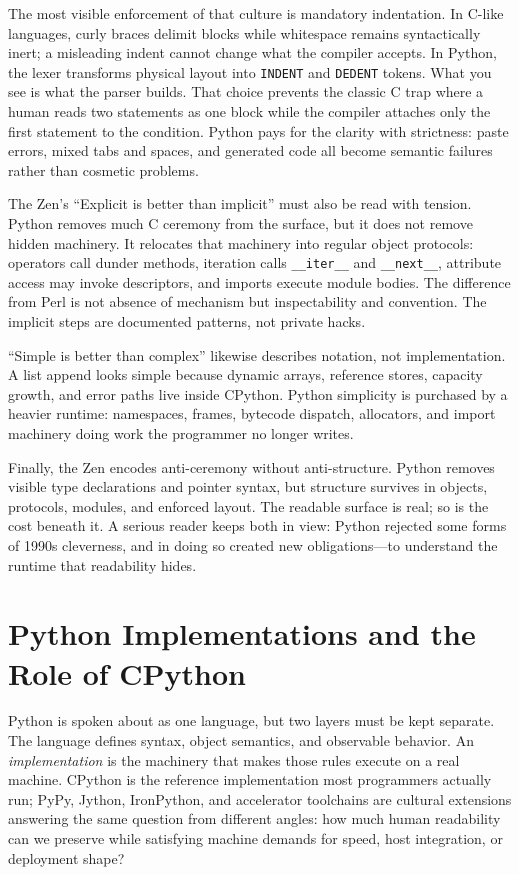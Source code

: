 \documentclass[a4paper,twoside]{report}
\begin{document}
The most visible enforcement of that culture is mandatory indentation. In C-like languages, curly braces delimit blocks while whitespace remains syntactically inert; a misleading indent cannot change what the compiler accepts. In Python, the lexer transforms physical layout into \texttt{INDENT} and \texttt{DEDENT} tokens. What you see is what the parser builds. That choice prevents the classic C trap where a human reads two statements as one block while the compiler attaches only the first statement to the condition. Python pays for the clarity with strictness: paste errors, mixed tabs and spaces, and generated code all become semantic failures rather than cosmetic problems.

The Zen's ``Explicit is better than implicit'' must also be read with tension. Python removes much C ceremony from the surface, but it does not remove hidden machinery. It relocates that machinery into regular object protocols: operators call dunder methods, iteration calls \texttt{\_\_iter\_\_} and \texttt{\_\_next\_\_}, attribute access may invoke descriptors, and imports execute module bodies. The difference from Perl is not absence of mechanism but inspectability and convention. The implicit steps are documented patterns, not private hacks.

``Simple is better than complex'' likewise describes notation, not implementation. A list append looks simple because dynamic arrays, reference stores, capacity growth, and error paths live inside CPython. Python simplicity is purchased by a heavier runtime: namespaces, frames, bytecode dispatch, allocators, and import machinery doing work the programmer no longer writes.

Finally, the Zen encodes anti-ceremony without anti-structure. Python removes visible type declarations and pointer syntax, but structure survives in objects, protocols, modules, and enforced layout. The readable surface is real; so is the cost beneath it. A serious reader keeps both in view: Python rejected some forms of 1990s cleverness, and in doing so created new obligations---to understand the runtime that readability hides.


\section{Python Implementations and the Role of CPython}

Python is spoken about as one language, but two layers must be kept separate. The language defines syntax, object semantics, and observable behavior. An \emph{implementation} is the machinery that makes those rules execute on a real machine. CPython is the reference implementation most programmers actually run; PyPy, Jython, IronPython, and accelerator toolchains are cultural extensions answering the same question from different angles: how much human readability can we preserve while satisfying machine demands for speed, host integration, or deployment shape?
\end{document}
